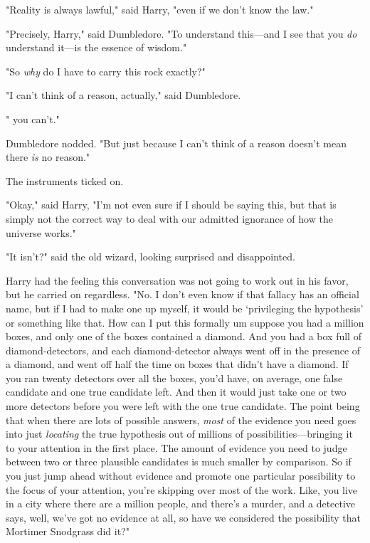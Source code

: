 "Reality is always lawful," said Harry, "even if we don't know the law."

"Precisely, Harry," said Dumbledore. "To understand this---and I see that you
\emph{do} understand it---is the essence of wisdom."

"So{\el} \emph{why} do I have to carry this rock exactly?"

"I can't think of a reason, actually," said Dumbledore.

"{\el} you can't."

Dumbledore nodded. "But just because I can't think of a reason doesn't mean
there \emph{is} no reason."

The instruments ticked on.

"Okay," said Harry, "I'm not even sure if I should be saying this, but that is
simply not the correct way to deal with our admitted ignorance of how the
universe works."

"It isn't?" said the old wizard, looking surprised and disappointed.

Harry had the feeling this conversation was not going to work out in his
favor, but he carried on regardless. "No. I don't even know if that fallacy
has an official name, but if I had to make one up myself, it would be
`privileging the hypothesis' or something like that. How can I put this
formally{\el} um{\el} suppose you had a million boxes, and only one of
the boxes contained a diamond. And you had a box full of diamond-detectors, and
each diamond-detector always went off in the presence of a diamond, and went
off half the time on boxes that didn't have a diamond. If you ran twenty
detectors over all the boxes, you'd have, on average, one false candidate and
one true candidate left. And then it would just take one or two more detectors
before you were left with the one true candidate. The point being that when
there are lots of possible answers, \emph{most} of the evidence you need goes
into just \emph{locating} the true hypothesis out of millions of
possibilities---bringing it to your attention in the first place. The amount of
evidence you need to judge between two or three plausible candidates is much
smaller by comparison. So if you just jump ahead without evidence and promote
one particular possibility to the focus of your attention, you're skipping over
most of the work. Like, you live in a city where there are a million people,
and there's a murder, and a detective says, well, we've got no evidence at all,
so have we considered the possibility that Mortimer Snodgrass did it?"


